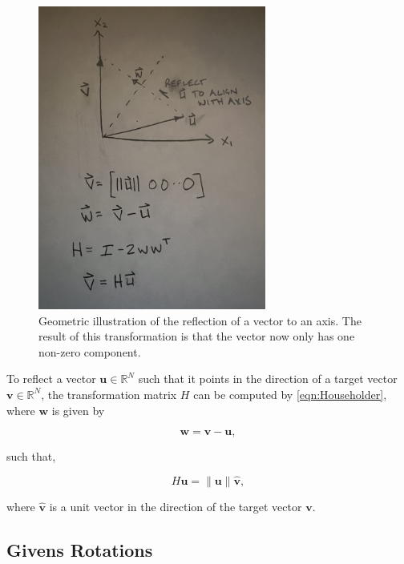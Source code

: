 \documentclass{article}
\begin{document}
\begin{figure}[h]
\centering
\includegraphics[width=75mm, angle=-90]{Householder2}
\caption{Geometric illustration of the reflection of a vector to an axis. The result of this transformation is that the vector now only has one non-zero component.}
\end{figure}

To reflect a vector $\mathbf{u}\in\mathbb{R}^N$ such that it points in the direction of a target vector $\mathbf{v}\in\mathbb{R}^N$, the transformation matrix $H$ can be computed by \eqref{eqn:Householder}, where $\mathbf{w}$ is given by

\begin{equation}
	\label{eqn:normal}
\mathbf{w} = \mathbf{v} - \mathbf{u},
\end{equation}

such that,

\begin{equation}
H\mathbf{u} = \|\mathbf{u}\|\mathbf{\hat{v}},
\end{equation}

where $\mathbf{\hat{v}}$ is a unit vector in the direction of the target vector $\mathbf{v}$.

\subsection{Givens Rotations}
\end{document}
